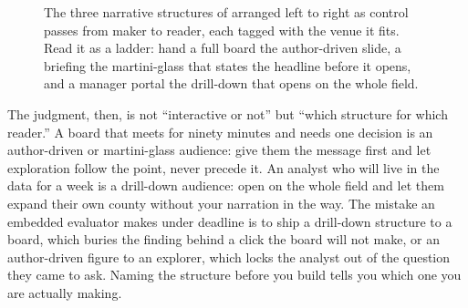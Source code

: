 \begin{figure}[htbp]
\centering
{}
\caption[Narrative structures on the control spectrum]{The three narrative structures of \textcite{segel2010narrative} arranged left to right as control passes from maker to reader, each tagged with the venue it fits. Read it as a ladder: hand a full board the author-driven slide, a briefing the martini-glass that states the headline before it opens, and a manager portal the drill-down that opens on the whole field.}
\label{fig:ch10-viz-spectrum}
\end{figure}

The judgment, then, is not \enquote{interactive or not} but \enquote{which structure for which reader.} A board that meets for ninety minutes and needs one decision is an author-driven or martini-glass audience: give them the message first and let exploration follow the point, never precede it. An analyst who will live in the data for a week is a drill-down audience: open on the whole field and let them expand their own county without your narration in the way. The mistake an embedded evaluator makes under deadline is to ship a drill-down structure to a board, which buries the finding behind a click the board will not make, or an author-driven figure to an explorer, which locks the analyst out of the question they came to ask. Naming the structure before you build tells you which one you are actually making.

